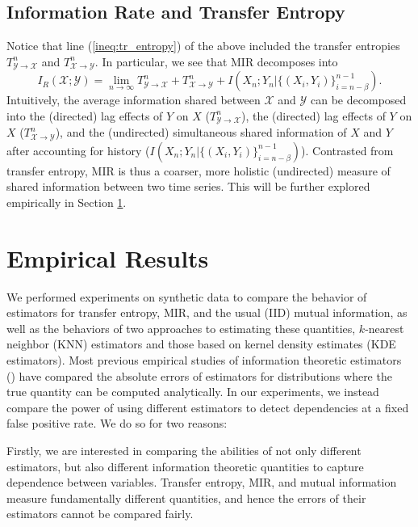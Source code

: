 \documentclass{article} %
\newcommand{\X}{\mathcal{X}}                        %
\newcommand{\Y}{\mathcal{Y}}                        %
\begin{document}
\subsection{Information Rate and Transfer Entropy}
Notice that line (\ref{ineq:tr_entropy}) of the above included the transfer
entropies $T_{\Y \to \X}^n$ and $T_{\X \to \Y}^n$. In particular, we see that
MIR decomposes into
\[I_R(\X;\Y)
    = \lim_{n \to \infty} T_{\Y \to \X}^n + T_{\X \to \Y}^n
                    + I(X_n; Y_n | \{(X_i,Y_i)\}_{i = n - \beta}^{n - 1}).\]
Intuitively, the average information shared between $\X$ and $\Y$ can be
decomposed into the (directed) lag effects of $Y$ on $X$ ($T_{\Y \to \X}^n$),
the (directed) lag effects of $Y$ on $X$ ($T_{\X \to \Y}^n$), and the
(undirected) simultaneous shared information of $X$ and $Y$ after accounting
for history ($I(X_n; Y_n | \{(X_i,Y_i)\}_{i = n - \beta}^{n - 1})$). Contrasted
from transfer entropy, MIR is thus a coarser, more holistic (undirected)
measure of shared information between two time series. This will be further
explored empirically in Section \ref{sec:empirical}.

\section{Empirical Results}
\label{sec:empirical}
We performed experiments on synthetic data to compare the behavior of
estimators for transfer entropy, MIR, and the usual (IID) mutual information,
as well as the behaviors of two approaches to estimating these quantities,
$k$-nearest neighbor (KNN) estimators and those based on kernel density
estimates (KDE estimators).
Most previous empirical studies of information theoretic estimators
(\cite{singh14densityfunc, krishnamurthy14divergences, pal2010estimation,moon14ensemble,gao2014stronglyDependent})
have compared the absolute errors of estimators for distributions where the
true quantity can be computed analytically. In our experiments, we instead
compare the power of using different estimators to detect dependencies at a
fixed false positive rate. We do so for two reasons:

Firstly, we are interested in comparing the abilities of not only different
estimators, but also different information theoretic quantities to capture
dependence between variables. Transfer entropy, MIR, and mutual information
measure fundamentally different quantities, and hence the errors of their
estimators cannot be compared fairly.
\end{document}
